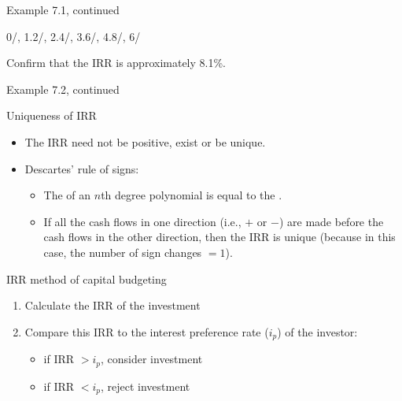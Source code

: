\documentclass{beamer}
\begin{document}
\begin{frame}{Example 7.1, continued}

\begin{center}
%
  {0/, 1.2/, 2.4/, 3.6/, 4.8/, 6/}
\end{center}

Confirm that the IRR is approximately 8.1\%.

\vfill
\end{frame}

\begin{frame}{Example 7.2, continued}

\begin{center}
\end{center}

\vfill
\end{frame}

\begin{frame}{Uniqueness of IRR}

\begin{itemize}
\item The IRR need not be positive, exist or be unique.
\item Descartes' rule of signs:
  \begin{itemize}
  \item The  of an $n$th degree polynomial is equal to the .
  \item If all the cash flows in one direction (i.e., $+$ or $-$) are made before the cash flows in the other direction, then the IRR is unique (because in this case, the number of sign changes $= 1$).
  \end{itemize}
\end{itemize}

\end{frame}

\begin{frame}{IRR method of capital budgeting}

\begin{enumerate}
\item Calculate the IRR of the investment
\item Compare this IRR to the interest preference rate ($i_p$) of the investor:
  \begin{itemize}
  \item if IRR $> i_p$, consider investment
  \item if IRR $< i_p$, reject investment
  \end{itemize}
\end{enumerate}

\end{frame}
\end{document}
